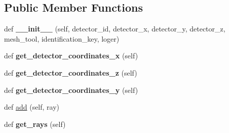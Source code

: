 \subsection*{Public Member Functions}
\begin{DoxyCompactItemize}
\item 
\mbox{\label{classMIS_1_1Muon__Imaging__Algorithm_1_1InvDataTools_1_1calculate_1_1Detector_1_1Detector_a5bb81bb4ba1f65234725f5957e59fcee}} 
def {\bfseries \+\_\+\+\_\+init\+\_\+\+\_\+} (self, detector\+\_\+id, detector\+\_\+x, detector\+\_\+y, detector\+\_\+z, mesh\+\_\+tool, identification\+\_\+key, loger)
\item 
\mbox{\label{classMIS_1_1Muon__Imaging__Algorithm_1_1InvDataTools_1_1calculate_1_1Detector_1_1Detector_af54bf943ec3da74f82b41ecb3778acfb}} 
def {\bfseries get\+\_\+detector\+\_\+coordinates\+\_\+x} (self)
\item 
\mbox{\label{classMIS_1_1Muon__Imaging__Algorithm_1_1InvDataTools_1_1calculate_1_1Detector_1_1Detector_ae8eea2c70c4646e52cd13e06908dc261}} 
def {\bfseries get\+\_\+detector\+\_\+coordinates\+\_\+z} (self)
\item 
\mbox{\label{classMIS_1_1Muon__Imaging__Algorithm_1_1InvDataTools_1_1calculate_1_1Detector_1_1Detector_a3376c66aa462f34521e943b04279e968}} 
def {\bfseries get\+\_\+detector\+\_\+coordinates\+\_\+y} (self)
\item 
def \hyperlink{classMIS_1_1Muon__Imaging__Algorithm_1_1InvDataTools_1_1calculate_1_1Detector_1_1Detector_a019181a2bb506ad65409ee311df7fcce}{add} (self, ray)
\item 
\mbox{\label{classMIS_1_1Muon__Imaging__Algorithm_1_1InvDataTools_1_1calculate_1_1Detector_1_1Detector_ad465ca8e0c69a9010ab11b56bca0eff7}} 
def {\bfseries get\+\_\+rays} (self)
\end{DoxyCompactItemize}

